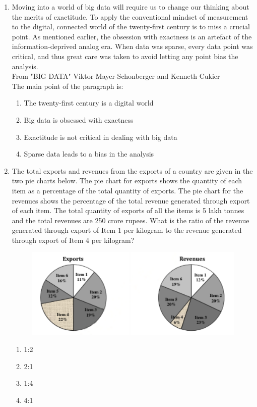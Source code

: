 \documentclass[journal,12pt,onecolumn]{IEEEtran}
\theoremstyle{remark}
\begin{document}
\begin{enumerate}
    \item Moving into a world of big data will require us to change our thinking about the merits of exactitude. To apply the conventional mindset of measurement to the digital, connected world of the twenty-first century is to miss a crucial point. As mentioned earlier, the obsession with exactness is an artefact of the information-deprived analog era. When data was sparse, every data point was critical, and thus great care was taken to avoid letting any point bias the analysis. \\
    From "BIG DATA" Viktor Mayer-Schonberger and Kenneth Cukier \\
    The main point of the paragraph is:
    \begin{enumerate}
        \item The twenty-first century is a digital world
        \item Big data is obsessed with exactness
        \item Exactitude is not critical in dealing with big data
        \item Sparse data leads to a bias in the analysis
    \end{enumerate}
\vspace{0.5cm}
    \item The total exports and revenues from the exports of a country are given in the two pie charts below. The pie chart for exports shows the quantity of each item as a percentage of the total quantity of exports. The pie chart for the revenues shows the percentage of the total revenue generated through export of each item. The total quantity of exports of all the items is 5 lakh tonnes and the total revenues are 250 crore rupees. What is the ratio of the revenue generated through export of Item 1 per kilogram to the revenue generated through export of Item 4 per kilogram?
    \begin{figure}[H]
        \centering
        \includegraphics[width=0.8\columnwidth]{q8}
        \caption*{}
        \label{fig:placeholder}
    \end{figure}
    \begin{multicols}{4}
        \begin{enumerate}
            \item 1:2
            \item 2:1
            \item 1:4
            \item 4:1
        \end{enumerate}
    \end{multicols}


\end{enumerate}
\end{document}
